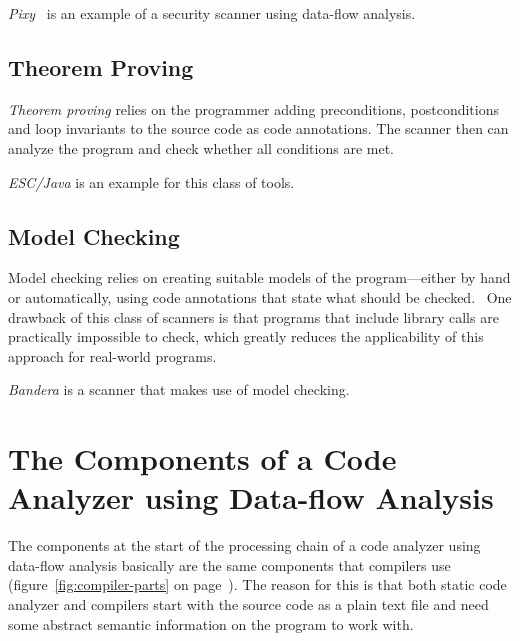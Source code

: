 \emph{Pixy}~\cite{pixy} is an example of a security scanner using data-flow analysis.


\subsection{Theorem Proving}

\emph{Theorem proving} relies on the programmer adding preconditions, postconditions and loop invariants to the source code as code annotations. The scanner then can analyze the program and check whether all conditions are met.~\cite{comparison-of-bug-finding-tools}

\emph{ESC/Java} is an example for this class of tools.


\subsection{Model Checking}

Model checking relies on creating suitable models of the program---either by hand or automatically, using code annotations that state what should be checked.~\cite{data-flow-analysis} One drawback of this class of scanners is that programs that include library calls are practically impossible to check, which greatly reduces the applicability of this approach for real-world programs.~\cite{comparison-of-bug-finding-tools}

\emph{Bandera} is a scanner that makes use of model checking.



\section{The Components of a Code Analyzer using Data-flow Analysis}

The components at the start of the processing chain of a code analyzer using data-flow analysis basically are the same components that compilers use (figure~\ref{fig:compiler-parts} on page~\pageref{fig:compiler-parts}). The reason for this is that both static code analyzer and compilers start with the source code as a plain text file and need some abstract semantic information on the program to work with.

